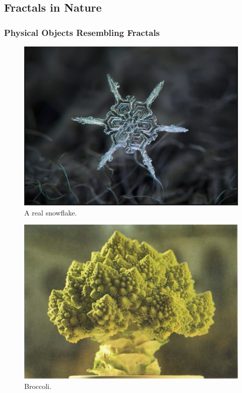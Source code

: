 \subsection{Fractals in Nature}
\subsubsection{Physical Objects Resembling Fractals}
\begin{figure}[h!]
  \includegraphics[width=\linewidth]{Pictures/real_snowflake.png}
  \caption{A real snowflake.}
  \label{fig:real_snowflake}
\end{figure}
\begin{figure}[h!]
  \includegraphics[width=\linewidth]{Pictures/broccoli.png}
  \caption{Broccoli.}
  \label{fig:broccoli}
\end{figure}

